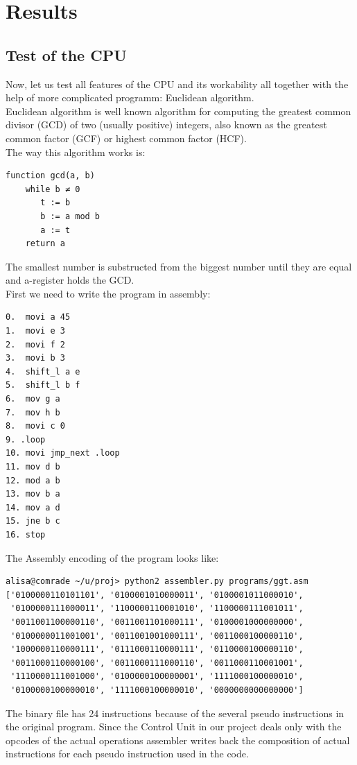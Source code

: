 \documentclass[11pt,a4paper]{article}
\begin{document}
\newpage
\section{Results}
\subsection{Test of the CPU}
Now, let us test all features of the CPU and its workability all together with the help of more complicated programm: Euclidean algorithm.\\
Euclidean algorithm is well known algorithm for computing the greatest common divisor (GCD) of two (usually positive) integers, also known as the greatest common factor (GCF) or highest common factor (HCF).\\
The way this algorithm works is:
\begin{verbatim}
function gcd(a, b)
    while b ≠ 0
       t := b
       b := a mod b
       a := t
    return a
\end{verbatim}
The smallest number is substructed from the biggest number until they are equal and a-register holds the GCD.\\
First we need to write the program in assembly:
\begin{verbatim}
0.  movi a 45
1.  movi e 3
2.  movi f 2
3.  movi b 3
4.  shift_l a e
5.  shift_l b f
6.  mov g a
7.  mov h b
8.  movi c 0
9. .loop
10. movi jmp_next .loop
11. mov d b
12. mod a b
13. mov b a
14. mov a d
15. jne b c
16. stop
\end{verbatim}
The Assembly encoding of the program looks like:
\begin{verbatim}
alisa@comrade ~/u/proj> python2 assembler.py programs/ggt.asm
['0100000110101101', '0100001010000011', '0100001011000010',
 '0100000111000011', '1100000110001010', '1100000111001011',
 '0011001100000110', '0011001101000111', '0100001000000000',
 '0100000011001001', '0011001001000111', '0011000100000110',
 '1000000110000111', '0111000110000111', '0110000100000110',
 '0011000110000100', '0011000111000110', '0011000110001001',
 '1110000111001000', '0100000100000001', '1111000100000010',
 '0100000100000010', '1111000100000010', '0000000000000000']
\end{verbatim}
The binary file has 24 instructions because of the several pseudo instructions in the original program. Since the Control Unit in our project deals only with the opcodes of the actual operations assembler writes back the composition of actual instructions for each pseudo instruction used in the code.\\
\end{document}
